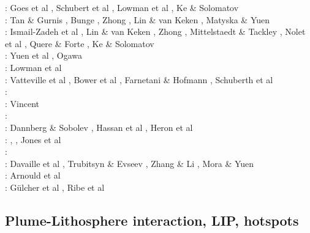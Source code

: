 \begin{scriptsize}
\twothousandfour: Goes et al \cite{goch04}, Schubert et al \cite{scmo04}, Lowman et al \cite{lokg04},
                  Ke \& Solomatov \cite{keso04} \\
\twothousandfive: Tan \& Gurnis \cite{tagu05}, Bunge \cite{bung05}, Zhong \cite{zhon05}, 
                  Lin \& van Keken \cite{liva05}, Matyska \& Yuen \cite{mayu05}\\
\twothousandsix: Ismail-Zadeh et al \cite{isst06}, Lin \& van Keken \cite{liva06a,liva06b}, 
                 Zhong \cite{zhon06}, Mittelstaedt \& Tackley \cite{mita06},
                 Nolet et al \cite{nokm06}, Quere \& Forte \cite{qufo06}, Ke \& Solomatov \cite{keso06}\\
\twothousandseven: Yuen et al \cite{yumh07}, Ogawa \cite{ogaw07}\\
\twothousandeight: Lowman et al \cite{logg08} \\
\twothousandnine: Vatteville et al \cite{vavl09}, Bower et al \cite{bogj09},
                  Farnetani \& Hofmann \cite{faho09}, Schuberth et al \cite{scbs09b}\\
\twothousandeleven: \cite{toyu11}\cite{talz11}\cite{burk11}\cite{memm11}\cite{dalt11}\cite{tree11}\\
\twothousandtwelve: Vincent \etal{} \cite{viym12}\\
\twothousandthirteen: \cite{dagm13}\cite{madd13}\cite{ande13}\cite{vadv13}\\
\twothousandfifteen: Dannberg \& Sobolev \cite{daso15}, Hassan et al \cite{hafg15}, 
                     Heron et al \cite{hels15}\\
\twothousandsixteen: \cite{kili16}, \cite{dannbergphd}, Jones et al \cite{jodc16}\\
\twothousandseventeen: \cite{moyu17}\cite{lizh17}\\
\twothousandeighteen: Davaille et al \cite{dacc18}, Trubitsyn \& Evseev \cite{trev18}, 
                      Zhang \& Li \cite{zhli18}, Mora \& Yuen \cite{moyu18}\\
\twothousandnineteen: Arnould et al \cite{argc19}\\
\twothousandtwenty: G{\"u}lcher et al \cite{gugm20}, Ribe et al \cite{rits20}
\end{scriptsize}

\subsection{Plume-Lithosphere interaction, LIP, hotspots}

